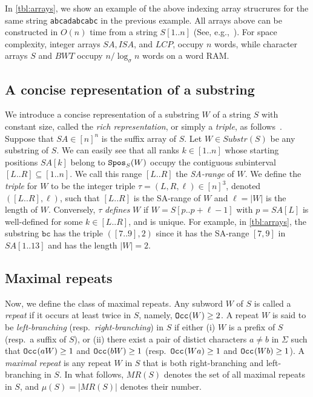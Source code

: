 
In \cref{tbl:arrays}, we show an example of the above indexing array strucrures for the same string \texttt{abcadabcabc\daller} in the previous example.
All arrays above can be constructed in $O(n)$ time from a string $S[1..n]$ (See, e.g.,~\cite{navarro2016cds:book}). For space complexity, integer arrays $SA, ISA$, and $LCP$, occupy $n$ words, while character arrays $S$ and $BWT$ occupy $n/\log_\sigma n$ words on a word RAM. 



\subsection{A concise representation of a substring}
\label{sec:triple}
We introduce a concise representation of a substring $W$ of a string $S$ with constant size, called the \textit{rich representation}, or simply a \textit{triple}, as follows~\cite{kasai:lee2001lcp:linear,ohlebusch2013bookbioinfo,belazzougui2015space:unusual}. 
Suppose that $SA \in [n]^n$ is the suffix array of $S$. Let $W \in Substr(S)$ be any substring of $S$. We can easily see that all ranks $k\in [1..n]$ whose starting positions $SA[k]$ belong to $\mathtt{Spos}_{S}(W)$ occupy the contiguous subinterval $[L..R]\subseteq [1..n]$. We call this range $[L..R]$ the \textit{SA-range} of $W$.
We define the \textit{triple} for $W$ to be the integer triple $\tau = (L, R, \ell) \in [n]^3$, denoted $([L..R], \ell)$, such that $[L..R]$ is the SA-range of $W$ and $\ell = |W|$ is the length of $W$.
Conversely, $\tau$ \textit{defines} $W$ if $W = S[p..p+\ell-1]$ with $p = SA[L]$ is well-defined for some $k \in [L..R]$, and is unique. 
For example, in \cref{tbl:arrays}, the substring $\mathtt{bc}$ has the triple $([7..9], 2)$ since it has the SA-range $[7,9]$ in $SA[1..13]$ and has the length $|W|=2$.


\subsection{Maximal repeats}
Now, we define the class of maximal repeats. 
Any subword $W$ of $S$ is called a \textit{repeat} if it occurs at least twice in $S$, namely, $\mathtt{Occ}_{}(W) \ge 2$.
A repeat $W$ is said to be \textit{left-branching} (resp.~\textit{right-branching}) in $S$ if either 
(i) $W$ is a prefix  of $S$ (resp.~a suffix of $S$), or 
(ii) there exist a pair of distict characters $a\not= b$ in $\Sigma$ such that $\mathtt{Occ}_{}(aW) \ge 1$ and $\mathtt{Occ}_{}(bW) \ge 1$ (resp.~$\mathtt{Occ}_{}(Wa) \ge 1$ and $\mathtt{Occ}_{}(Wb) \ge 1$).
A \textit{maximal repeat} is any repeat $W$ in $S$ that is both right-branching and left-branching in $S$. In what follows, $MR(S)$ denotes the set of all maximal repeats in $S$, and $\mu(S) = |MR(S)|$ denotes their number. 

